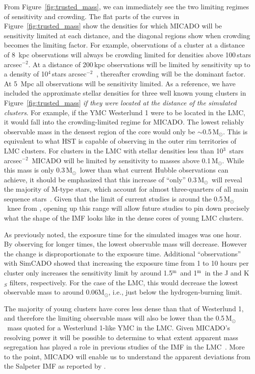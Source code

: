 \documentclass{aa}
\newcommand{\m}{$^\mathrm{m}$~}
\newcommand{\msun}{M$_\odot$~}
\newcommand{\msune}{M$_\odot$}
\newcommand{\s}{$\sim$}
\newcommand{\h}[1]{$^{#1}$}
\newcommand{\spa}{stars arcsec$^{-2}$~}
\newcommand{\spae}{stars arcsec$^{-2}$}
\begin{document}
From Figure~\ref{fig:trusted_mass}, we can immediately see the two limiting regimes of sensitivity and crowding.
The flat parts of the curves in Figure~\ref{fig:trusted_mass} show the densities for which MICADO will be sensitivity limited at each distance, and the diagonal regions show when crowding becomes the limiting factor.
For example, observations of a cluster at a distance of 8\, kpc observations will always be crowding limited for densities above 100\,\spae.
At a distance of 200\,kpc observations will be limited by sensitivity up to a density of 10\h4\,\spa, thereafter crowding will be the dominant factor.
At 5\, Mpc all observations will be sensitivity limited.
As a reference, we have included the approximate stellar densities for three well known young clusters in Figure~\ref{fig:trusted_mass} \textit{if they were located at the distance of the simulated clusters}.
For example, if the YMC Westerlund 1 were to be located in the LMC, it would fall into the crowding-limited regime for MICADO\@.
The lowest reliably observable mass in the densest region of the core would only be \s0.5\,\msune.
This is equivalent to what HST is capable of observing in the outer rim territories of LMC clusters.
For clusters in the LMC with stellar densities less than 10\h3~\spa MICADO will be limited by sensitivity to masses above 0.1\,\msune.
While this mass is only 0.3\,\msun lower than what current Hubble observations can achieve, it should be emphasized that this increase of ``only'' 0.3\,\msun will reveal the majority of M-type stars, which account for almost three-quarters of all main sequence stars~\citep{ledrew2001}.
Given that the limit of current studies is around the 0.5\,\msun knee from \citet{kroupa2001}, opening up this range will allow future studies to pin down precisely what the shape of the IMF looks like in the dense cores of young LMC clusters.

As previously noted, the exposure time for the simulated images was one hour.
By observing for longer times, the lowest observable mass will decrease.
However the change is disproportionate to the exposure time.
Additional ``observations'' with SimCADO showed that increasing the exposure time from 1 to 10 hours per cluster only increases the sensitivity limit by around 1.5\m and 1\m in the J and K$_S$ filters, respectively.
For the case of the LMC, this would decrease the lowest observable mass to around 0.06\msune, i.e., just below the hydrogen-burning limit.

The majority of young clusters have cores less dense than that of Westerlund 1, and therefore the limiting observable mass will also be lower than the 0.5\,\msun mass quoted for a Westerlund 1-like YMC in the LMC\@.
Given MICADO's resolving power it will be possible to determine to what extent apparent mass segregation has played a role in previous studies of the IMF in the LMC~\citep{Ascenso2009-de}.
More to the point, MICADO will enable us to understand the apparent deviations from the Salpeter IMF as reported by \citet{dario2009, geha2013, kalirai2013}.
\end{document}
